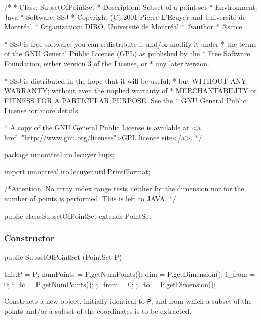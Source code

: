 \begin{code}
\begin{hide}
/*
 * Class:        SubsetOfPointSet
 * Description:  Subset of a point set
 * Environment:  Java
 * Software:     SSJ 
 * Copyright (C) 2001  Pierre L'Ecuyer and Université de Montréal
 * Organization: DIRO, Université de Montréal
 * @author       
 * @since

 * SSJ is free software: you can redistribute it and/or modify it under
 * the terms of the GNU General Public License (GPL) as published by the
 * Free Software Foundation, either version 3 of the License, or
 * any later version.

 * SSJ is distributed in the hope that it will be useful,
 * but WITHOUT ANY WARRANTY; without even the implied warranty of
 * MERCHANTABILITY or FITNESS FOR A PARTICULAR PURPOSE.  See the
 * GNU General Public License for more details.

 * A copy of the GNU General Public License is available at
   <a href="http://www.gnu.org/licenses">GPL licence site</a>.
 */
\end{hide}
package umontreal.iro.lecuyer.hups;\begin{hide}

import umontreal.iro.lecuyer.util.PrintfFormat;

 /*Attention: No array index range tests neither for the dimension
   nor for the number of points is performed. This is left to JAVA. */
\end{hide}

public class SubsetOfPointSet extends PointSet \begin{hide} {
   protected PointSet P;                  // Source points
   protected int i_from, i_to, i_index[]; // Limits or lookup for row
   protected int j_from, j_to, j_index[]; // Limits or lookup for column

\end{hide}
\end{code}

\subsubsection*{Constructor}
\begin{code}

   public SubsetOfPointSet (PointSet P) \begin{hide} {
      this.P = P;
      numPoints = P.getNumPoints();
      dim = P.getDimension();
      i_from = 0;
      i_to = P.getNumPoints();
      j_from = 0;
      j_to = P.getDimension();
   }\end{hide}
\end{code}
 \begin{tabb}
   Constructs a new  object, initially identical to \texttt{P}, 
   and from which a subset of the points and/or a subset of the coordinates 
   is to be extracted.  
 \end{tabb}
\begin{htmlonly}
\end{htmlonly}
 
